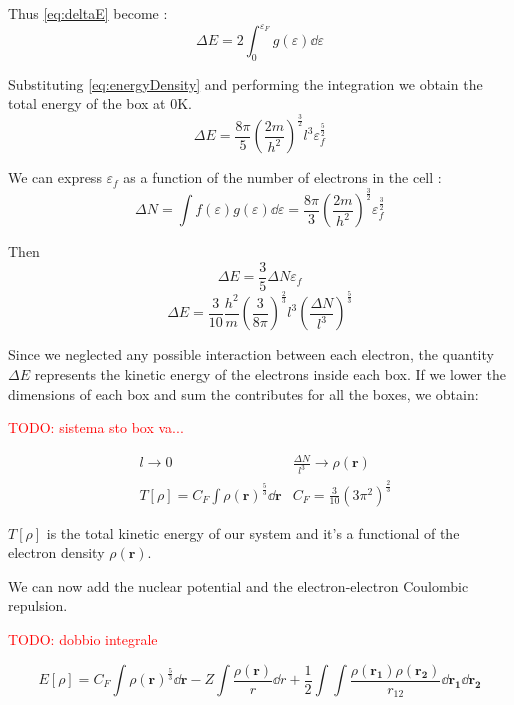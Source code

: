 \documentclass[a4paper,12pt]{article}
\newcommand\mynotes[1]{\begin{flushright}

\textcolor{red}{TODO: #1}\end{flushright}}
\begin{document}
Thus \eqref{eq:deltaE} become :
\begin{equation}
	\Delta E = 2 \int_{0}^{\varepsilon_F} g(\varepsilon) \dd{\varepsilon}
\end{equation}

Substituting \eqref{eq:energyDensity} and performing the integration we obtain the total energy of the box at 0K.
\begin{equation}
	\Delta E = \frac{8\pi}{5} \left( \frac{2 m}{h^2} \right)^{\frac{3}{2}} l^3 \varepsilon_{f}^{\frac{5}{2}}
\end{equation}

We can express $\varepsilon_f$ as a function of the number of electrons in the cell :
\begin{equation}
	\Delta N = \int f(\varepsilon) g(\varepsilon) \dd{\varepsilon} = \frac{8\pi}{3} \left( \frac{2 m}{h^2} \right)^{\frac{3}{2}} \varepsilon_{f}^{\frac{3}{2}}
\end{equation}

Then 
\begin{equation}
	\Delta E  = \frac{3}{5} \Delta N \varepsilon_{f}
\end{equation}
\begin{equation}
			  \Delta E = \frac{3}{10} \frac{h^2}{m} \left( \frac{3}{8\pi} \right)^{\frac{2}{3}} l^{3} \left( \frac{\Delta N}{l^{3}} \right)^{\frac{5}{3}}
\end{equation}

Since we neglected any possible interaction between each electron, the quantity $\Delta E$ represents the kinetic energy of the electrons inside each box.
If we lower the dimensions of each box and sum the contributes for all the boxes, we obtain:

\mynotes{sistema sto box va...}
\begin{align}
	& l \rightarrow 0 
	& \frac{\Delta N}{l^{3}} \rightarrow \rho(\mathbf{r})\\
	& T[\rho] = C_{F} \int \rho(\mathbf{r})^{\frac{5}{3}} \dd{\mathbf{r}}
	& C_{F} = \frac{3}{10}(3 \pi^{2})^{\frac{2}{3}}
\end{align}

$T[\rho]$ is the total kinetic energy of our system and it's a functional of the electron density $\rho(\mathbf{r})$.

We can now add the nuclear potential and the electron-electron Coulombic repulsion.

\mynotes{dobbio integrale}
\begin{equation}\label{eq:ThomasFermiEnergy}
	E[\rho] = C_{F} \int \rho(\mathbf{r})^{\frac{5}{3}} \dd{\mathbf{r}} 
			- Z \int \frac{\rho(\mathbf{r})}{r} \dd{r} 
			+ \frac{1}{2} \int\int \frac{\rho(\mathbf{r_{1}}) \rho(\mathbf{r_{2}}) }{r_{12}} \dd{\mathbf{r_1}} \dd{\mathbf{r_2}}
\end{equation}
\end{document}
